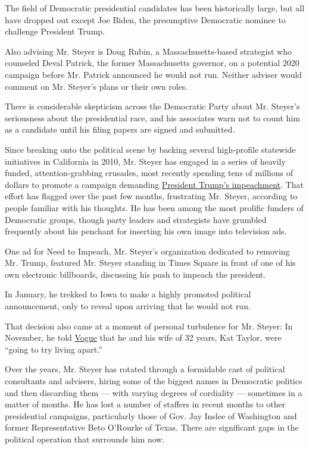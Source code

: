 The field of Democratic presidential candidates has been historically
large, but all have dropped out except Joe Biden, the presumptive
Democratic nominee to challenge President Trump.

Also advising Mr. Steyer is Doug Rubin, a Massachusetts-based strategist
who counseled Deval Patrick, the former Massachusetts governor, on a
potential 2020 campaign before Mr. Patrick announced he would not run.
Neither adviser would comment on Mr. Steyer's plans or their own roles.

There is considerable skepticism across the Democratic Party about Mr.
Steyer's seriousness about the presidential race, and his associates
warn not to count him as a candidate until his filing papers are signed
and submitted.

Since breaking onto the political scene by backing several high-profile
statewide initiatives in California in 2010, Mr. Steyer has engaged in a
series of heavily funded, attention-grabbing crusades, most recently
spending tens of millions of dollars to promote a campaign demanding
\href{https://www.nytimes.com/2018/01/23/us/politics/impeach-trump-democrats-tom-steyer.html}{President
Trump's impeachment}. That effort has flagged over the past few months,
frustrating Mr. Steyer, according to people familiar with his thoughts.
He has been among the most prolific funders of Democratic groups, though
party leaders and strategists have grumbled frequently about his
penchant for inserting his own image into television ads.

One ad for Need to Impeach, Mr. Steyer's organization dedicated to
removing Mr. Trump, featured Mr. Steyer standing in Times Square in
front of one of his own electronic billboards, discussing his push to
impeach the president.

In January, he trekked to Iowa to make a highly promoted political
announcement, only to reveal upon arriving that he would not run.

That decision also came at a moment of personal turbulence for Mr.
Steyer: In November, he told
\href{https://www.vogue.com/article/tom-steyer-interview-impeaching-donald-trump?verso=true}{Vogue}
that he and his wife of 32 years, Kat Taylor, were ``going to try living
apart.''

Over the years, Mr. Steyer has rotated through a formidable cast of
political consultants and advisers, hiring some of the biggest names in
Democratic politics and then discarding them --- with varying degrees of
cordiality --- sometimes in a matter of months. He has lost a number of
staffers in recent months to other presidential campaigns, particularly
those of Gov. Jay Inslee of Washington and former Representative Beto
O'Rourke of Texas. There are significant gaps in the political operation
that surrounds him now.

